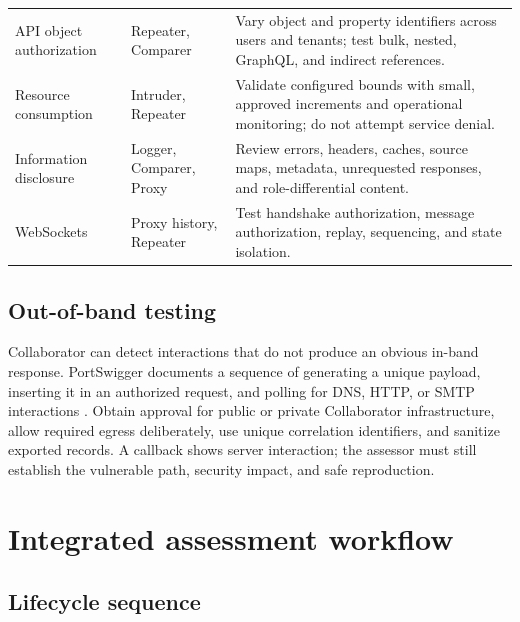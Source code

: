 \documentclass[11pt,letterpaper]{article}
\begin{document}
\begin{longtable}{@{}L{1.25in}L{1.85in}L{3.45in}@{}}
API object authorization & Repeater, Comparer & Vary object and property identifiers across users and tenants; test bulk, nested, GraphQL, and indirect references. \\
Resource consumption & Intruder, Repeater & Validate configured bounds with small, approved increments and operational monitoring; do not attempt service denial. \\
Information disclosure & Logger, Comparer, Proxy & Review errors, headers, caches, source maps, metadata, unrequested responses, and role-differential content. \\
WebSockets & Proxy history, Repeater & Test handshake authorization, message authorization, replay, sequencing, and state isolation. \\
\bottomrule
\end{longtable}

\subsection{Out-of-band testing}

Collaborator can detect interactions that do not produce an obvious in-band response. PortSwigger documents a sequence of generating a unique payload, inserting it in an authorized request, and polling for DNS, HTTP, or SMTP interactions \citep{burpcollaborator}. Obtain approval for public or private Collaborator infrastructure, allow required egress deliberately, use unique correlation identifiers, and sanitize exported records. A callback shows server interaction; the assessor must still establish the vulnerable path, security impact, and safe reproduction.

\section{Integrated assessment workflow}

\subsection{Lifecycle sequence}
\end{document}
